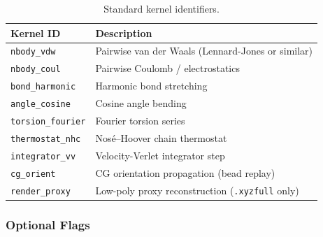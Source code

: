 \documentclass[12pt, a4paper, oneside]{article}
\begin{document}
\begin{table}[htbp]

  \centering

  \caption{Standard kernel identifiers.}

  \label{tab:kernel_ids}

  \begin{tabular}{lp{9cm}}

    \toprule

    Kernel ID & Description \\

    \midrule

    \texttt{nbody\_vdw}      & Pairwise van der Waals (Lennard-Jones or similar) \\

    \texttt{nbody\_coul}     & Pairwise Coulomb / electrostatics \\

    \texttt{bond\_harmonic}  & Harmonic bond stretching \\

    \texttt{angle\_cosine}   & Cosine angle bending \\

    \texttt{torsion\_fourier}& Fourier torsion series \\

    \texttt{thermostat\_nhc} & Nos\'{e}--Hoover chain thermostat \\

    \texttt{integrator\_vv}  & Velocity-Verlet integrator step \\

    \texttt{cg\_orient}      & CG orientation propagation (bead replay) \\

    \texttt{render\_proxy}   & Low-poly proxy reconstruction (\texttt{.xyzfull} only) \\

    \bottomrule

  \end{tabular}

\end{table}


\subsubsection{Optional Flags}
\end{document}
